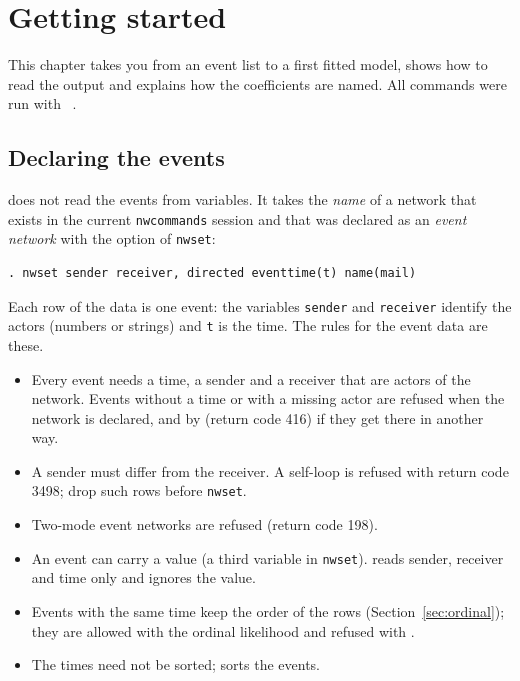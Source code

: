 \chapter{Getting started}\label{ch:start}

This chapter takes you from an event list to a first fitted model, shows how to read the output and explains how the coefficients are named. All commands were run with \nwrem{}~\pkgversion{}.

\section{Declaring the events}\label{sec:declare}

\nwrem{} does not read the events from variables. It takes the \emph{name} of a network that exists in the current \texttt{nwcommands} session and that was declared as an \emph{event network} with the option  of \texttt{nwset}:
\begin{lstlisting}
. nwset sender receiver, directed eventtime(t) name(mail)
\end{lstlisting}
Each row of the data is one event: the variables \texttt{sender} and \texttt{receiver} identify the actors (numbers or strings) and \texttt{t} is the time. The rules for the event data are these.
\begin{itemize}[nosep]
  \item Every event needs a time, a sender and a receiver that are actors of the network. Events without a time or with a missing actor are refused when the network is declared, and by \nwrem{} (return code 416) if they get there in another way.
  \item A sender must differ from the receiver. A self-loop is refused with return code 3498; drop such rows before \texttt{nwset}.
  \item Two-mode event networks are refused (return code 198).
  \item An event can carry a value (a third variable in \texttt{nwset}). \nwrem{} reads sender, receiver and time only and ignores the value.
  \item Events with the same time keep the order of the rows (Section~\ref{sec:ordinal}); they are allowed with the ordinal likelihood and refused with .
  \item The times need not be sorted; \nwrem{} sorts the events.
\end{itemize}

